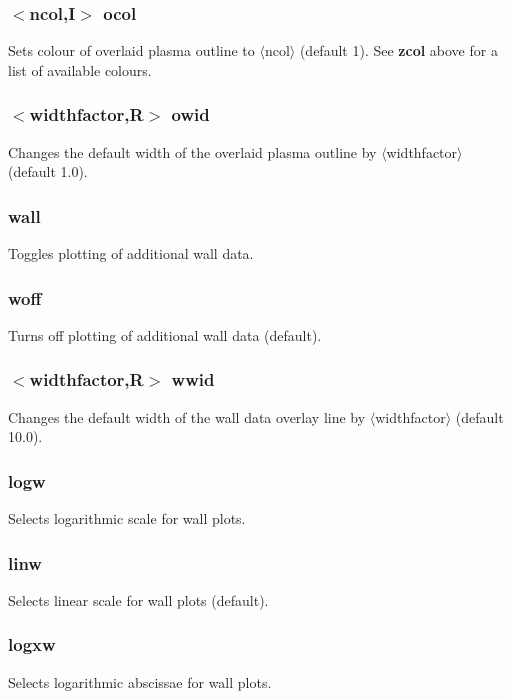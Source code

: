 \documentclass[a4paper,10pt]{report}
\begin{document}
\subsubsection{$<$ncol,{\bf I}$>$ ocol}\label{sec:ocol}
Sets colour of overlaid plasma outline to $\langle$ncol$\rangle$ (default 1).
See {\bf zcol} above for a list of available colours.

\subsubsection{$<$widthfactor,{\bf R}$>$ owid}\label{sec:owid}
Changes the default width of the overlaid plasma outline by $\langle$widthfactor$\rangle$ (default 1.0).

\subsubsection{wall}\label{sec:wall}
Toggles plotting of additional wall data.

\subsubsection{woff}\label{sec:woff}
Turns off plotting of additional wall data (default).

\subsubsection{$<$widthfactor,{\bf R}$>$ wwid}\label{sec:wwid}
Changes the default width of the wall data overlay line by $\langle$widthfactor$\rangle$ (default 10.0).

\subsubsection{logw}\label{sec:logw}
Selects logarithmic scale for wall plots.

\subsubsection{linw}\label{sec:linw}
Selects linear scale for wall plots (default).

\subsubsection{logxw}\label{sec:logxw}
Selects logarithmic abscissae for wall plots.
\end{document}
